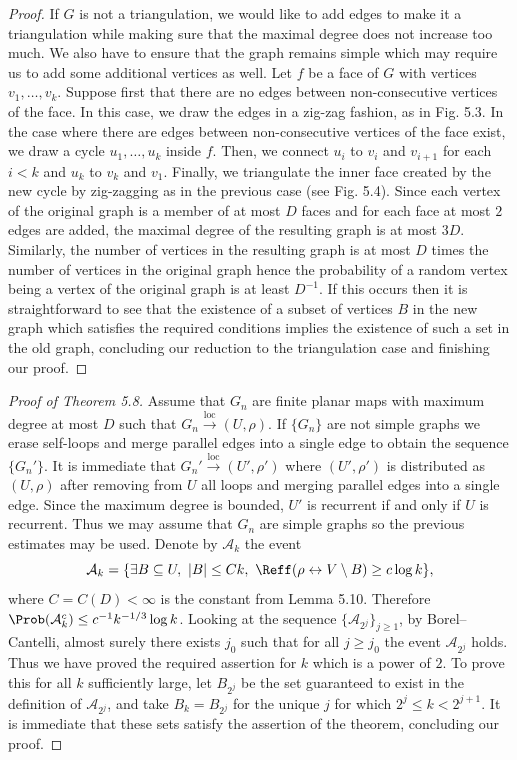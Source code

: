 \begin{proof}
If $G$ is not a triangulation, we would like to add edges to make it a triangulation while making sure that the maximal degree does not increase too much. We also have to ensure that the graph remains simple which may require us to add some additional vertices as well. Let $f$ be a face of $G$ with vertices $v_1,\ldots,v_k$. Suppose first that there are no edges between non-consecutive vertices of the face. In this case, we draw the edges in a zig-zag fashion, as in Fig. 5.3.
In the case where there are edges between non-consecutive vertices of the face exist, we draw a cycle $u_1,\ldots,u_k$ inside $f$. Then, we connect $u_i$ to $v_i$ and $v_{i+1}$ for each $i<k$ and $u_k$ to $v_k$ and $v_1$. Finally, we triangulate the inner face created by the new cycle by zig-zagging as in the previous case (see Fig. 5.4).
Since each vertex of the original graph is a member of at most $D$ faces and for each face at most $2$ edges are added, the maximal degree of the resulting graph is at most $3D$. Similarly, the number of vertices in the resulting graph is at most $D$ times the number of vertices in the original graph hence the probability of a random vertex being a vertex of the original graph is at least $D^{-1}$. If this occurs then it is straightforward to see that the existence of a subset of vertices $B$ in the new graph which satisfies the required conditions implies the existence of such a set in the old graph, concluding our reduction to the triangulation case and finishing our proof.
\end{proof}

\begin{proof}[Proof of Theorem 5.8]
Assume that $G_n$ are finite planar maps with maximum degree at most $D$ such that $G_n\xrightarrow{\mathrm{loc}}(U,\rho)$. If $\{G_n\}$ are not simple graphs we erase self-loops and merge parallel edges into a single edge to obtain the sequence $\{G_n'\}$. It is immediate that $G_n'\xrightarrow{\mathrm{loc}}(U',\rho')$ where $(U',\rho')$ is distributed as $(U,\rho)$ after removing from $U$ all loops and merging parallel edges into a single edge. Since the maximum degree is bounded, $U'$ is recurrent if and only if $U$ is recurrent. Thus we may assume that $G_n$ are simple graphs so the previous estimates may be used.
Denote by $\mathcal A_k$ the event
\[
\mathcal A_k=\{\exists B\subseteq U,\ |B|\le Ck,\ \Reff(\rho\leftrightarrow V\setminus B)\ge c\log k\},
\]
where $C=C(D)<\infty$ is the constant from Lemma 5.10. Therefore $\Prob(\mathcal A_k^c)\le c^{-1}k^{-1/3}\log k$. Looking at the sequence $\{\mathcal A_{2^j}\}_{j\ge1}$, by Borel--Cantelli, almost surely there exists $j_0$ such that for all $j\ge j_0$ the event $\mathcal A_{2^j}$ holds. Thus we have proved the required assertion for $k$ which is a power of $2$.
To prove this for all $k$ sufficiently large, let $B_{2^j}$ be the set guaranteed to exist in the definition of $\mathcal A_{2^j}$, and take $B_k=B_{2^j}$ for the unique $j$ for which $2^j\le k<2^{j+1}$. It is immediate that these sets satisfy the assertion of the theorem, concluding our proof.
\end{proof}

